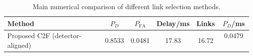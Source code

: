 \begin{table}[t]
    \centering
    \caption{Main numerical comparison of different link selection methods.}
    \label{tab:main_summary}
    \begin{tabular}{l c c c c c}
        \hline
        Method & $P_D$ & $P_{\mathrm{FA}}$ & Delay/ms & Links & $P_D$/ms \\
        \hline
        Proposed C2F (detector-aligned) & 0.8533 & 0.0481 & 17.83 & 16.72 & 0.0479 \
        \hline
    \end{tabular}
\end{table}
